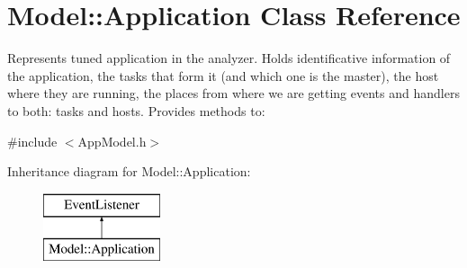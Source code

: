 \hypertarget{class_model_1_1_application}{\section{Model\-:\-:Application Class Reference}
\label{class_model_1_1_application}
}


Represents tuned application in the analyzer. Holds identificative information of the application, the tasks that form it (and which one is the master), the host where they are running, the places from where we are getting events and handlers to both\-: tasks and hosts. Provides methods to\-:  




{\ttfamily \#include $<$App\-Model.\-h$>$}

Inheritance diagram for Model\-:\-:Application\-:\begin{figure}[H]
\begin{center}
\leavevmode
\includegraphics[height=2.000000cm]{class_model_1_1_application}
\end{center}
\end{figure}
